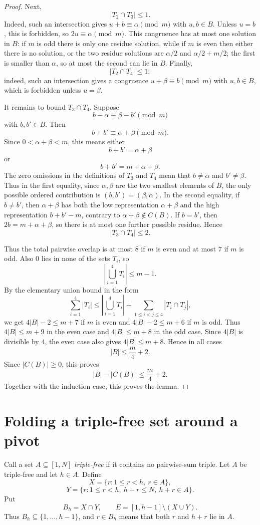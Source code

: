 \documentclass[10pt,a4paper]{amsart}
\begin{document}
\begin{proof}
Next,
\[
  |T_2\cap T_3|\leq 1.
\]
Indeed, such an intersection gives $u+b\equiv \alpha\pmod m$ with $u,b\in B$. Unless $u=b$, this is forbidden, so $2u\equiv\alpha\pmod m$. This congruence has at most one solution in $B$: if $m$ is odd there is only one residue solution, while if $m$ is even then either there is no solution, or the two residue solutions are $\alpha/2$ and $\alpha/2+m/2$; the first is smaller than $\alpha$, so at most the second can lie in $B$.
Finally,
\[
  |T_2\cap T_4|\leq 1;
\]
indeed, such an intersection gives a congruence $u+\beta\equiv b\pmod m$ with $u,b\in B$, which is forbidden unless $u=\beta$.

It remains to bound $T_3\cap T_4$. Suppose
\[
  b-\alpha\equiv \beta-b'\pmod m
\]
with $b,b'\in B$. Then
\[
  b+b'\equiv \alpha+\beta\pmod m.
\]
Since $0<\alpha+\beta<m$, this means either
\[
  b+b'=\alpha+\beta
\]
or
\[
  b+b'=m+\alpha+\beta.
\]
The zero omissions in the definitions of $T_3$ and $T_4$ mean that $b\neq\alpha$ and $b'\neq\beta$. Thus in the first equality, since $\alpha,\beta$ are the two smallest elements of $B$, the only possible ordered contribution is $(b,b')=(\beta,\alpha)$. In the second equality, if $b\neq b'$, then $\alpha+\beta$ has both the low representation $\alpha+\beta$ and the high representation $b+b'-m$, contrary to $\alpha+\beta\notin C(B)$. If $b=b'$, then $2b=m+\alpha+\beta$, so there is at most one further possible residue. Hence
\[
  |T_3\cap T_4|\leq 2.
\]

Thus the total pairwise overlap is at most $8$ if $m$ is even and at most $7$ if $m$ is odd. Also $0$ lies in none of the sets $T_i$, so
\[
  \left|\bigcup_{i=1}^4T_i\right|\leq m-1.
\]
By the elementary union bound in the form
\[
  \sum_{i=1}^4 |T_i|
  \leq \left|\bigcup_{i=1}^4T_i\right|+
  \sum_{1\leq i<j\leq 4}|T_i\cap T_j|,
\]
we get $4|B|-2\leq m+7$ if $m$ is even and $4|B|-2\leq m+6$ if $m$ is odd. Thus $4|B|\leq m+9$ in the even case and $4|B|\leq m+8$ in the odd case. Since $4|B|$ is divisible by $4$, the even case also gives $4|B|\leq m+8$. Hence in all cases
\[
  |B|\leq \frac m4+2.
\]
Since $|C(B)|\geq 0$, this proves
\[
  |B|-|C(B)|\leq \frac m4+2.
\]
Together with the induction case, this proves the lemma.
\end{proof}

\section{Folding a triple-free set around a pivot}

Call a set $A\subseteq[1,N]$ \emph{triple-free} if it contains no pairwise-sum triple. Let $A$ be triple-free and let $h\in A$. Define
\[
  X=\{r:1\leq r<h,\ r\in A\},
\]
\[
  Y=\{r:1\leq r<h,\ h+r\leq N,\ h+r\in A\}.
\]
Put
\[
  B_h=X\cap Y,
  \qquad
  E=[1,h-1]\setminus(X\cup Y).
\]
Thus $B_h\subseteq\{1,\ldots,h-1\}$, and $r\in B_h$ means that both $r$ and $h+r$ lie in $A$.
\end{document}
